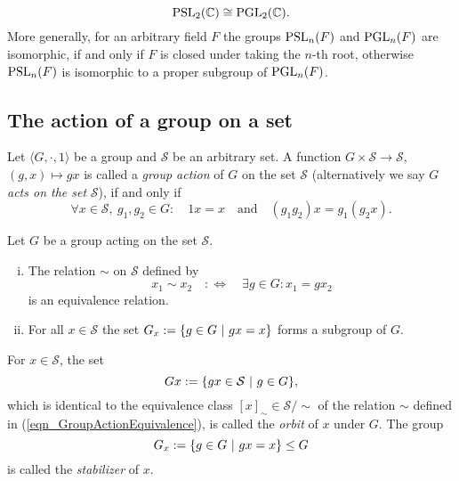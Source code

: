 \begin{example}
\begin{equation*}
\operatorname{PSL}_{2}(\mathbb{C}) \cong \operatorname{PGL}_{2}(\mathbb{C}).
\end{equation*}
More generally, for an arbitrary field $F$ the groups $\operatorname{PSL}_{n}(F)$ and $\operatorname{PGL}_{n}(F)$ are isomorphic, if and only if $F$ is closed under taking the $n$-th root, otherwise $\operatorname{PSL}_{n}(F)$ is isomorphic to a proper subgroup of $\operatorname{PGL}_{n}(F)$.
\end{example}

\subsection{The action of a group on a set}

\begin{definition}
\label{dfn_GroupAction}
Let $\langle G, \cdot, 1 \rangle$ be a group and $\mathcal{S}$ be an arbitrary set. A function $G \times \mathcal{S} \to \mathcal{S}$, $(g, x) \mapsto g x$ is called a \emph{group action} of $G$ on the set $\mathcal{S}$ (alternatively we say $G$ \emph{acts on the set} $\mathcal{S}$), if and only if
\begin{equation}
\label{eqn_GroupAction}
\forall x \in \mathcal{S},\ g_1, g_2 \in G:\quad 1 x = x \quad \text{and} \quad (g_1 g_2) x = g_1 (g_2 x).
\end{equation}
\end{definition}

\begin{theorem}
Let $G$ be a group acting on the set $\mathcal{S}$.
\begin{enumerate}[(i)]
\item The relation $\sim$ on $\mathcal{S}$ defined by
\begin{equation}
\label{eqn_GroupActionEquivalence}
x_1 \sim x_2 \quad:\Leftrightarrow\quad \exists g \in G: x_1 = g x_2
\end{equation}
is an equivalence relation.
\item For all $x \in \mathcal{S}$ the set $G_x := \{ g \in G \ | \ gx = x \}$ forms a subgroup of $G$.
\end{enumerate}
\end{theorem}

\begin{definition}
\label{dfn_OrbitStabilizer}
For $x \in \mathcal{S}$, the set 
\begin{equation*}
Gx := \{ gx \in \mathcal{S} \ | \ g \in G \},
\end{equation*}which is identical to the equivalence class $[x]_\sim \in \mathcal{S}/\sim$ of the relation $\sim$ defined in (\ref{eqn_GroupActionEquivalence}), is called the \emph{orbit} of $x$ under $G$. The group 
\begin{equation*}
G_x := \{ g \in G \ | \ gx = x \} \le G
\end{equation*} is called the \emph{stabilizer} of $x$.
\end{definition}

